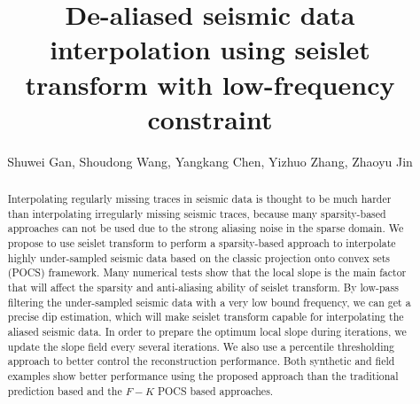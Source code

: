 
\title{De-aliased seismic data interpolation using seislet transform with low-frequency constraint}
\renewcommand{\thefootnote}{\fnsymbol{footnote}}

\author{Shuwei Gan\footnotemark[1], Shoudong Wang\footnotemark[1], Yangkang Chen\footnotemark[2], Yizhuo Zhang\footnotemark[3], Zhaoyu Jin\footnotemark[4]}
\address{
\footnotemark[1]
State Key Laboratory of Petroleum Resources and Prospecting \\
China University of Petroleum \\
Fuxue Road 18th\\
Beijing, China, 102200 \\
gsw19900128@126.com\\
\footnotemark[2] Jackson School of Geosciences\\
The University of Texas at Austin\\
University Station, Box X\\
Austin, TX 78713-8924, USA \\
Email: ykchen@utexas.edu\\
\footnotemark[3] Institut de Physique du Globe de Paris (IPGP)\\ 
1 Rue Jussieu\\
75005 Paris, France  \\
Email: yizhuozh@gmail.com\\
\footnotemark[3]School of Geosciences,
University of Edinburgh,
Edinburgh,UK, EH9 3JW,
Email: s1263999@sms.ed.ac.uk
}

\maketitle

\begin{abstract}
Interpolating regularly missing traces in seismic data is thought to be much harder than interpolating irregularly missing seismic traces, because many sparsity-based approaches can not be used due to the strong aliasing noise in the sparse domain. We propose to use seislet transform to perform a sparsity-based approach to interpolate highly under-sampled seismic data based on the classic projection onto convex sets (POCS) framework. Many numerical tests show that the local slope is the main factor that will affect the sparsity and anti-aliasing ability of seislet transform. By low-pass filtering the under-sampled seismic data with a very low bound frequency, we can get a precise dip estimation, which will make seislet transform capable for interpolating the aliased seismic data. In order to prepare the optimum local slope during iterations, we update the slope field every several iterations. We also use a percentile thresholding approach to better control the reconstruction performance. Both synthetic and field examples show better performance using the proposed approach than the traditional prediction based and the $F-K$ POCS based approaches.
\end{abstract}

